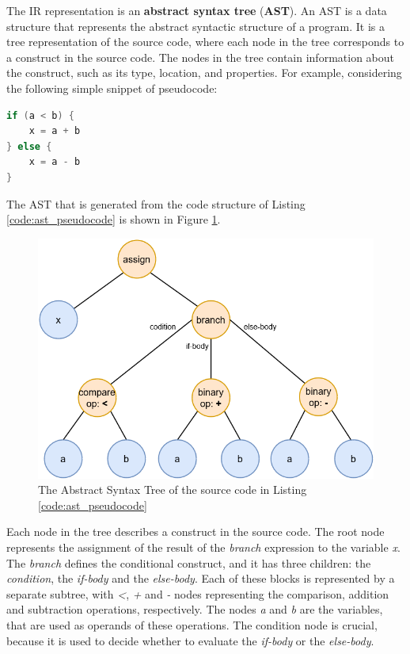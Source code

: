 The IR representation is an \textbf{abstract syntax tree} (\textbf{AST}). An AST \cite{ast_explanation} is a data structure that represents the abstract syntactic structure of a program. It is a tree representation of the source code, where each node in the tree corresponds to a construct in the source code. The nodes in the tree contain information about the construct, such as its type, location, and properties.\newline
For example, considering the following simple snippet of pseudocode:
\begin{lstlisting}[caption={Pseudocode of a simple assignment and expression}, language=Kotlin, captionpos=b, label={code:ast_pseudocode}]
if (a < b) {
    x = a + b
} else {
    x = a - b
}
\end{lstlisting}
The AST that is generated from the code structure of Listing \ref{code:ast_pseudocode} is shown in Figure \ref{fig:ast_pseudocode_example}.
\begin{figure}[!ht]
    \centering
    \includegraphics[scale=0.5]{document/chapters/2-metaprogramming/images/ast_pseudocode_example.png}
    \caption{The Abstract Syntax Tree of the source code in Listing \ref{code:ast_pseudocode}}
    \label{fig:ast_pseudocode_example}
\end{figure}
Each node in the tree describes a construct in the source code. The root node represents the assignment of the result of the \textit{branch} expression to the variable \textit{x}. The \textit{branch} defines the conditional construct, and it has three children: the \textit{condition}, the \textit{if-body} and the \textit{else-body}. Each of these blocks is represented by a separate subtree, with \textit{<}, \textit{+} and \textit{-} nodes representing the comparison, addition and subtraction operations, respectively. The nodes \textit{a} and \textit{b} are the variables, that are used as operands of these operations.\newline
The condition node is crucial, because it is used to decide whether to evaluate the \textit{if-body} or the \textit{else-body}.

